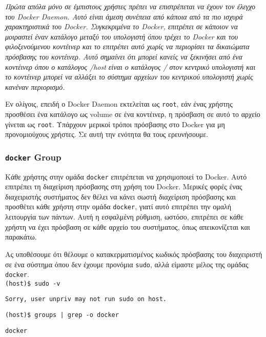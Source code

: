 \emph{Πρώτα απόλα μόνο σε έμπιστους χρήστες πρέπει να επιστρέπεται να έχουν
τον έλεγχο του \textlatin{Docker Daemon}. Αυτό είναι άμεση συνέπεια από κάποια
από τα πιο ισχυρά χαρακτηριστικά του \textlatin{Docker}. Συγκεκριμένα το
\textlatin{Docker}, επιτρέπει σε κάποιον να μοιραστεί έναν κατάλογο μεταξύ του
υπολογιστή όπου τρέχει το \textlatin{Docker} και του φιλοξενούμενου κοντέινερ
και το επιτρέπει αυτό χωρίς να περιορίσει τα δικαιώματα πρόσβασης του κοντέινερ.
Αυτό σημαίνει ότι μπορεί κανείς να ξεκινήσει από ένα κοντέινερ όπου ο κατάλογος
\textlatin{/host} είναι ο κατάλογος / στον κεντρικό υπολογιστή και το κοντέινερ
μπορεί να αλλάξει το σύστημα αρχείων του κεντρικού υπολογιστή χωρίς κανέναν
περιορισμό.}

Εν ολίγοις, επειδή ο \textlatin{Docker Daemon} εκτελείται ως
\texttt{\textlatin{root}}, εάν ένας χρήστης προσθέσει ένα κατάλογο ως
\textlatin{volume} σε ένα κοντέινερ, η πρόσβαση σε αυτό το αρχείο γίνεται ως
\texttt{\textlatin{root}}. Υπάρχουν μερικοί τρόποι πρόσβασης στο Docker για μη
προνομιούχους χρήστες. Σε αυτή την ενότητα θα τους ερευνήσουμε.

\subsubsection{\texttt{\textlatin{docker}} \textlatin{Group}}

Κάθε χρήστης στην ομάδα \texttt{\textlatin{docker}} επιτρέπεται να χρησιμοποιεί
το \textlatin{Docker}.
Αυτό επιτρέπει τη διαχείριση πρόσβασης στη χρήση του \textlatin{Docker}.
Μερικές φορές ένας διαχειριστής συστήματος δεν θέλει να κάνει σωστή διαχείριση
πρόσβασης και προσθέτει κάθε χρήστη στην ομάδα \texttt{\textlatin{docker}},
γιατί αυτό επιτρέπει την ομαλή λειτουργία των πάντων.
Αυτή η εσφαλμένη ρύθμιση, ωστόσο, επιτρέπει σε κάθε χρήστη να έχει πρόσβαση σε
κάθε αρχείο του συστήματος, όπως απεικονίζεται και παρακάτω.

Ας υποθέσουμε ότι θέλουμε ο κατακερματισμένος κωδικός πρόσβασης του
διαχειριστή σε ένα σύστημα όπου δεν έχουμε προνόμια \texttt{\textlatin{sudo}},
αλλά είμαστε μέλος της ομάδας \texttt{\textlatin{docker}}. \\
 
\texttt{\textlatin{(host)\$ sudo -v}}

\texttt{\textlatin{Sorry, user unpriv may not run sudo on host.}}

\texttt{\textlatin{(host)\$ groups | grep -o docker}}

\texttt{\textlatin{docker}}

